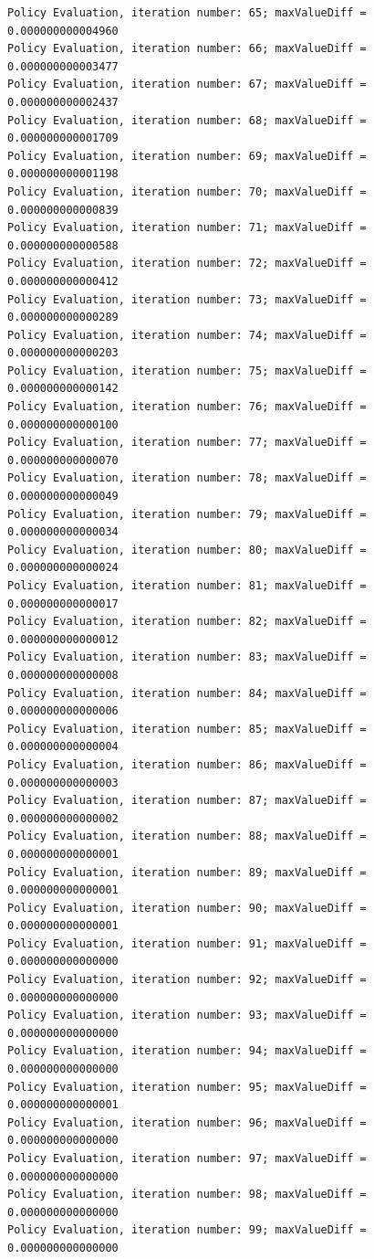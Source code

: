 \documentclass{article}
\begin{document}
\begin{scriptsize}
\begin{verbatim}
Policy Evaluation, iteration number: 65; maxValueDiff = 0.000000000004960 
Policy Evaluation, iteration number: 66; maxValueDiff = 0.000000000003477 
Policy Evaluation, iteration number: 67; maxValueDiff = 0.000000000002437 
Policy Evaluation, iteration number: 68; maxValueDiff = 0.000000000001709 
Policy Evaluation, iteration number: 69; maxValueDiff = 0.000000000001198 
Policy Evaluation, iteration number: 70; maxValueDiff = 0.000000000000839 
Policy Evaluation, iteration number: 71; maxValueDiff = 0.000000000000588 
Policy Evaluation, iteration number: 72; maxValueDiff = 0.000000000000412 
Policy Evaluation, iteration number: 73; maxValueDiff = 0.000000000000289 
Policy Evaluation, iteration number: 74; maxValueDiff = 0.000000000000203 
Policy Evaluation, iteration number: 75; maxValueDiff = 0.000000000000142 
Policy Evaluation, iteration number: 76; maxValueDiff = 0.000000000000100 
Policy Evaluation, iteration number: 77; maxValueDiff = 0.000000000000070 
Policy Evaluation, iteration number: 78; maxValueDiff = 0.000000000000049 
Policy Evaluation, iteration number: 79; maxValueDiff = 0.000000000000034 
Policy Evaluation, iteration number: 80; maxValueDiff = 0.000000000000024 
Policy Evaluation, iteration number: 81; maxValueDiff = 0.000000000000017 
Policy Evaluation, iteration number: 82; maxValueDiff = 0.000000000000012 
Policy Evaluation, iteration number: 83; maxValueDiff = 0.000000000000008 
Policy Evaluation, iteration number: 84; maxValueDiff = 0.000000000000006 
Policy Evaluation, iteration number: 85; maxValueDiff = 0.000000000000004 
Policy Evaluation, iteration number: 86; maxValueDiff = 0.000000000000003 
Policy Evaluation, iteration number: 87; maxValueDiff = 0.000000000000002 
Policy Evaluation, iteration number: 88; maxValueDiff = 0.000000000000001 
Policy Evaluation, iteration number: 89; maxValueDiff = 0.000000000000001 
Policy Evaluation, iteration number: 90; maxValueDiff = 0.000000000000001 
Policy Evaluation, iteration number: 91; maxValueDiff = 0.000000000000000 
Policy Evaluation, iteration number: 92; maxValueDiff = 0.000000000000000 
Policy Evaluation, iteration number: 93; maxValueDiff = 0.000000000000000 
Policy Evaluation, iteration number: 94; maxValueDiff = 0.000000000000000 
Policy Evaluation, iteration number: 95; maxValueDiff = 0.000000000000001 
Policy Evaluation, iteration number: 96; maxValueDiff = 0.000000000000000 
Policy Evaluation, iteration number: 97; maxValueDiff = 0.000000000000000 
Policy Evaluation, iteration number: 98; maxValueDiff = 0.000000000000000 
Policy Evaluation, iteration number: 99; maxValueDiff = 0.000000000000000 

\end{verbatim}
\end{scriptsize}
\end{document}
